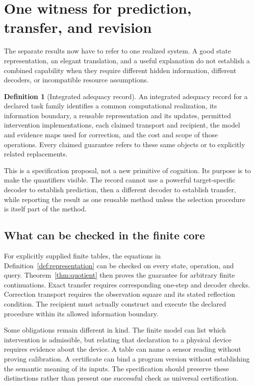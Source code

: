 \documentclass[11pt,letterpaper]{article}
\theoremstyle{plain}
\theoremstyle{definition}
\newtheorem{definition}[theorem]{Definition}
\begin{document}
\section{One witness for prediction, transfer, and revision}\label{sec:witness}
The separate results now have to refer to one realized system. A good state representation, an elegant translation, and a useful explanation do not establish a combined capability when they require different hidden information, different decoders, or incompatible resource assumptions.

\begin{definition}[Integrated adequacy record]\label{def:witness}
An integrated adequacy record for a declared task family identifies a common computational realization, its information boundary, a reusable representation and its updates, permitted intervention implementations, each claimed transport and recipient, the model and evidence maps used for correction, and the cost and scope of those operations. Every claimed guarantee refers to these same objects or to explicitly related replacements.
\end{definition}
This is a specification proposal, not a new primitive of cognition. Its purpose is to make the quantifiers visible. The record cannot use a powerful target-specific decoder to establish prediction, then a different decoder to establish transfer, while reporting the result as one reusable method unless the selection procedure is itself part of the method.

\subsection{What can be checked in the finite core}
For explicitly supplied finite tables, the equations in Definition~\ref{def:representation} can be checked on every state, operation, and query. Theorem~\ref{thm:quotient} then proves the guarantee for arbitrary finite continuations. Exact transfer requires corresponding one-step and decoder checks. Correction transport requires the observation square and its stated reflection condition. The recipient must actually construct and execute the declared procedure within its allowed information boundary.

Some obligations remain different in kind. The finite model can list which intervention is admissible, but relating that declaration to a physical device requires evidence about the device. A table can name a sensor reading without proving calibration. A certificate can bind a program version without establishing the semantic meaning of its inputs. The specification should preserve these distinctions rather than present one successful check as universal certification.
\end{document}
